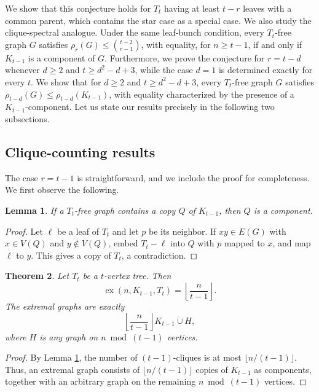 \documentclass[11pt,a4paper]{article}
\newtheorem{theorem}{Theorem}[section]
\newtheorem{lemma}[theorem]{Lemma}
\newcommand{\ex}{\operatorname{ex}}
\newcommand{\dunion}{\mathbin{\dot\cup}}
\begin{document}
 We show that this conjecture holds for $T_t$ having at least $t-r$ leaves with a common parent, which contains the star case as a special case.   We also study the clique-spectral analogue. Under the same leaf-bunch condition, every $T_t$-free graph $G$ satisfies $\rho_r(G)\le\binom{t-2}{r-1}$, with equality, for $n\ge t-1$, if and only if $K_{t-1}$ is a component of $G$. Furthermore,
 we prove the conjecture for \(r=t-d\) whenever \(d\ge2\) and \(t\ge d^2-d+3\), while the case \(d=1\) is determined exactly for every \(t\). We show that for \(d\ge2\) and \(t\ge d^2-d+3\), every \(T_t\)-free graph \(G\) satisfies \(\rho_{t-d}(G)\le\rho_{t-d}(K_{t-1})\), with equality characterized by the presence of a \(K_{t-1}\)-component. Let us state our results precisely in the following two subsections.









\subsection{Clique-counting results}\label{counting-results}

The case $r=t-1$ is straightforward, and we include the proof for completeness. We first observe the following.

\begin{lemma}\label{isolation}
If a \(T_t\)-free graph contains a copy \(Q\) of \(K_{t-1}\), then \(Q\) is a component.
\end{lemma}


\begin{proof}
Let \(\ell\) be a leaf of \(T_t\) and let \(p\) be its neighbor. If \(xy\in E(G)\) with \(x\in V(Q)\) and \(y\notin V(Q)\), embed \(T_t-\ell\) into \(Q\) with \(p\) mapped to \(x\), and map \(\ell\) to \(y\). This gives a copy of \(T_t\), a contradiction.
\end{proof}

\begin{theorem}\label{T1}
Let \(T_t\) be a \(t\)-vertex tree. Then
\[
\ex(n,K_{t-1},T_t)=\left\lfloor\frac{n}{t-1}\right\rfloor.
\]
The extremal graphs are exactly
\[
\left\lfloor\frac{n}{t-1}\right\rfloor K_{t-1}\dunion H,
\]
where \(H\) is any graph on \(n\bmod(t-1)\) vertices.
\end{theorem}

\begin{proof}


 By Lemma \ref{isolation}, the number of \((t-1)\)-cliques is at most \(\lfloor n/(t-1)\rfloor\). Thus, an extremal graph consists of $\lfloor n/(t-1)\rfloor$ copies of $K_{t-1}$ as components, together with an arbitrary graph on the remaining $n\bmod(t-1)$ vertices.
\end{proof}
\end{document}
